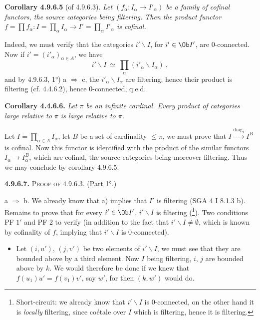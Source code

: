 \textbf{Corollary 4.9.6.5} (of 4.9.6.3). \textit{Let $(f_\alpha : I_\alpha \longrightarrow I'_\alpha)$ be a family of cofinal functors, the source categories being filtering. Then the product functor $f = \prod f_\alpha : I = \prod_\alpha I_\alpha \longrightarrow I' = \prod_\alpha I'_\alpha$ is cofinal.}

Indeed, we must verify that the categories $i'\backslash I$, for $i' \in \Ob I'$, are 0-connected. Now if $i' = (i'_\alpha)_{\alpha \in A}$, we have
\[
i'\backslash I \ \simeq \ \prod_\alpha (i'_\alpha\backslash I_\alpha) \ ,
\]
and by 4.9.6.3, 1°) a $\Longrightarrow$ c, the $i'_\alpha\backslash I_\alpha$ are filtering, hence their product is filtering
(cf. 4.4.6.2), hence 0-connected, q.e.d. %

\textbf{Corollary 4.4.6.6.} \textit{Let $\pi$ be an infinite cardinal. Every product of categories large relative to $\pi$ is large relative to $\pi$.} %

Let $I = \prod_{\alpha \in A} I_\alpha$, let $B$ be a set of cardinality $\leqslant \pi$, we must prove that $I \xrightarrow{\mathrm{diag}_I} I^B$ is cofinal. Now this functor is identified with the product of the similar functors $I_\alpha \longrightarrow I_\alpha^B$, which are cofinal, the source categories being moreover filtering. Thus we may conclude by corollary 4.9.6.5.

\textbf{4.9.6.7.} \textsc{Proof of} 4.9.6.3. (Part 1°.)

a $\Longrightarrow$ b. We already know that a) implies that $I'$ is filtering (SGA 4 I 8.1.3 b). Remains to prove that for every $i' \in \Ob I'$, $i'\backslash I$ is filtering (\footnote[103]{Short-circuit: we already know that $i'\backslash I$ is 0-connected, on the other hand it is \textit{locally} filtering, since coétale over $I$ which is filtering, hence it is filtering.}). Two conditions PF $1'$ and PF 2 to verify (in addition to the fact that $i'\backslash I \neq \emptyset$, which is known by cofinality of $f$, implying that $i'\backslash I$ is 0-connected).
\begin{itemize}[label={}]
\item[1)] Let $(i,u')$, $(j,v')$ be two elements of $i'\backslash I$, we must see that they are bounded above by a third element. Now $I$ being filtering, $i$, $j$ are bounded above by $k$. We would therefore be done if we knew that $f(u_1)u' = f(v_1)v'$, say $w'$, for then $(k,w')$ would do.
\end{itemize}